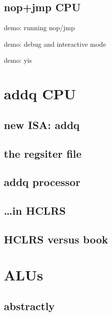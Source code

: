 \subsection{nop+jmp CPU}
\begin{frame}{demo: running nop/jmp}
\end{frame}
\begin{frame}{demo: debug and interactive mode}
\end{frame}
\begin{frame}{demo: yis}
\end{frame}


\section{addq CPU}

\subsection{new ISA: addq}



\subsection{the regsiter file}


\subsection{addq processor}

\subsection{\ldots in HCLRS}


\subsection{HCLRS versus book}


\section{ALUs}
\subsection{abstractly}


